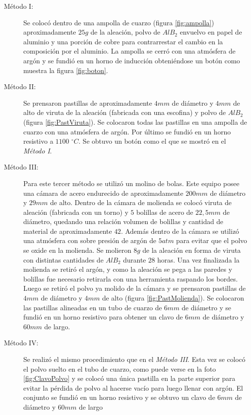 \documentclass[a4paper,12pt,fleqn,twoside,openany]{book}
\begin{document}
\begin{description}
\item[Método I:] Se colocó dentro de una ampolla de cuarzo (figura \ref{fig:ampolla}) aproximadamente $25 g$ de la aleación, polvo de $AlB_2$ envuelvo en papel de aluminio y una porción de 
cobre para contrarrestar el cambio en la composición por el aluminio. La ampolla se cerró con una atmósfera de argón y se fundió en un horno de inducción obteniéndose un botón como muestra la figura \ref{fig:boton}.

\item[Método II:] Se prensaron pastillas de aproximadamente $4 mm$ de diámetro y $4 mm$ de alto de viruta de la aleación (fabricada con una escofina) y polvo de $AlB_2$ (figura \ref{fig:PastViruta}). Se 
colocaron todas las pastillas en una ampolla de cuarzo con una atmósfera de argón. Por último se fundió en un horno resistivo a $1100$ $^\circ C$. Se obtuvo un botón como el que se mostró en el \textsl{Método I}.

\item[Método III:] Para este tercer método se utilizó un molino de bolas. Este equipo posee una cámara de acero endurecido de aproximadamente $200 mm$ de diámetro y $29 mm$ de alto. Dentro de la cámara de molienda se colocó viruta de aleación (fabricada con un torno) y $5$ bolillas de acero de $22,5 mm$ de diámetro, quedando una relación volumen de bolillas y cantidad de material de aproximadamente $42$. Además dentro de la cámara se utilizó una atmósfera con sobre presión de argón de $5 atm$ para evitar que el polvo se oxide en la molienda.
Se molieron $8g$ de la aleación en forma de viruta con distintas cantidades de $AlB_2$ durante $28$ horas.  Una vez finalizada la molienda se retiró el argón, y 
como la aleación se pega a las paredes y bolillas fue necesario retirarla con una herramienta raspando los bordes.
Luego se retiró el polvo ya molido de la cámara y se prensaron pastillas de $4mm$ de diámetro y $4mm$ de alto (figura \ref{fig:PastMolienda}). Se colocaron las pastillas alineadas en un tubo de cuarzo de $6 mm$ de diámetro y se fundió en un horno resistivo para obtener un clavo de $6 mm$ de diámetro y $60 mm$ de largo.

\item[Método IV:] Se realizó el mismo procedimiento que en el \textsl{Método III}. Esta vez se colocó el polvo suelto en el tubo de cuarzo, como puede verse en la foto \ref{fig:ClavoPolvo} y se colocó una única pastilla en la parte superior para evitar la pérdida de polvo al hacerse vacío para luego llenar con argón. El conjunto se fundió en un horno resistivo y se obtuvo un clavo de $6 mm$ de diámetro y $60 mm$ de largo 
\end{description}
\end{document}
